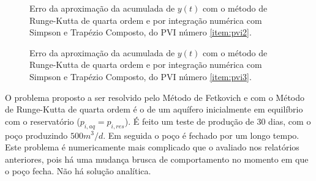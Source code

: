 \documentclass[final,5p]{elsarticle}
\numberwithin{equation}{section}
\begin{document}
        \begin{figure}[hbt!]
            \caption{Erro da aproximação da acumulada de $y(t)$ com o método de Runge-Kutta de quarta ordem e por integração numérica com Simpson e Trapézio Composto, do PVI número \ref{item:pvi2}.}
            \label{fig:teste2}
        \end{figure}

        \begin{figure}[hbt!]
            \caption{Erro da aproximação da acumulada de $y(t)$ com o método de Runge-Kutta de quarta ordem e por integração numérica com Simpson e Trapézio Composto, do PVI número \ref{item:pvi3}.}
            \label{fig:teste3}
        \end{figure}

        O problema proposto a ser resolvido pelo Método de Fetkovich e com o Método de Runge-Kutta de quarta ordem é o de um aquífero inicialmente em equilíbrio com o reservatório ($p_{i,aq} = p_{i,res}$). É feito um teste de produção de 30 dias, com o poço produzindo $500 m^3/d$. Em seguida o poço é fechado por um longo tempo. Este problema é numericamente mais complicado que o avaliado nos relatórios anteriores, pois há uma mudança brusca de comportamento no momento em que o poço fecha. Não há solução analítica.
\end{document}
